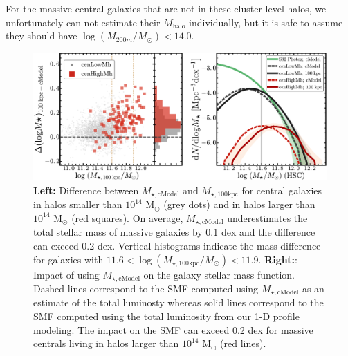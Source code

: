 \documentclass{emulateapj}
\def\rbcg{\texttt{cenHighMh}}
\def\nbcg{\texttt{cenLowMh}}
\def\mstar{{$M_{\star}$}}
\def\mhalo{{$M_{\mathrm{halo}}$}}
\def\logms{{$\log (M_{\star}/M_{\odot})$}}
\def\mtot{{$M_{\star,100\mathrm{kpc}}$}}
\def\mcmodel{{$M_{\star,\mathrm{cModel}}$}}
\def\logmtot{{$\log (M_{\star,100\mathrm{kpc}}/M_{\odot})$}}
\begin{document}
\begin{CJK*}{UTF8}{gbsn}
    For the massive central galaxies that are not in these cluster-level halos, 
    we unfortunately can not estimate their \mhalo{} individually, but it is safe 
    to assume they should have $\log (M_{200m}/M_{\odot}) < 14.0$.     
 
    

  \begin{figure}[bt!]
      \centering 
      \includegraphics[width=\textwidth]{fig/redbcg_smf_new}
      \caption{\textbf{Left:} Difference between \mcmodel{} and \mtot{} for central
      	galaxies in halos smaller than $10^{14}$ M$_{\odot}$ (grey dots) and in
        halos larger than $10^{14}$ M$_{\odot}$ (red squares). 
        On average, \mcmodel{} underestimates the total stellar mass of massive 
        galaxies by 0.1 dex and the difference can exceed 0.2 dex. 
        Vertical histograms indicate the mass difference for galaxies with
        $11.6<$\logmtot{}$<11.9$. 
        \textbf{Right:}: Impact of using \mcmodel{} on the galaxy stellar mass
        function. 
        Dashed lines correspond to the SMF computed using \mcmodel{} as an estimate
        of the total luminosty whereas solid lines correspond to the SMF computed
        using the total luminosity from our 1-D profile modeling. 
        The impact on the SMF can exceed 0.2 dex for massive centrals living in
        halos larger than $10^{14}$ M$_{\odot}$ (red lines).}
      \label{fig:smf1}
  \end{figure}
  
          

\end{CJK*}
\end{document}
